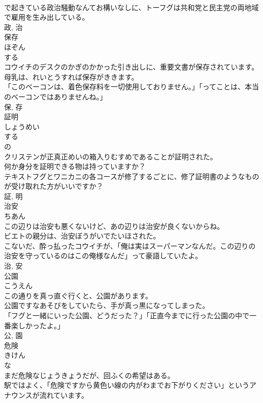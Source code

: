 \documentclass[8pt]{extreport}
\begin{document}
\begin{CJK}{UTF8}{min}
\\	で起きている政治騒動なんてお構いなしに、トーフグは共和党と民主党の両地域で雇用を生み出している。	
\\	政, 治	
\\	保存	
\\	ほぞん	
\\	する 
\\	コウイチのデスクのかぎのかかった引き出しに、重要文書が保存されています。	
\\	母乳は、れいとうすれば保存がききます。	
\\	「このベーコンは、着色保存料を一切使用しておりません。」「ってことは、本当のベーコンではありませんね。」	
\\	保, 存	
\\	証明	
\\	しょうめい	
\\	する 
\\	の 
\\	クリステンが正真正めいの箱入りむすめであることが証明された。	
\\	何か身分を証明できる物は持っていますか？	
\\	テキストフグとワニカニの各コースが修了するごとに、修了証明書のようなものが受け取れた方がいいですか？	
\\	証, 明	
\\	治安	
\\	ちあん	
\\	この辺りは治安も悪くないけど、あの辺りは治安が良くないからね。	
\\	ビエトの親分は、治安ぼうがいでたいほされた。	
\\	こないだ、酔っ払ったコウイチが、「俺は実はスーパーマンなんだ。この辺りの治安を守っているのはこの俺様なんだ」って豪語していたよ。	
\\	治, 安	
\\	公園	
\\	こうえん	
\\	この通りを真っ直ぐ行くと、公園があります。	
\\	公園ですなあそびをしていたら、手が真っ黒になってしまった。	
\\	「フグと一緒にいった公園、どうだった？」「正直今までに行った公園の中で一番楽しかったよ。」	
\\	公, 園	
\\	危険	
\\	きけん	
\\	な 
\\	まだ危険なじょうきょうだが、回ふくの希望はある。	
\\	駅ではよく、「危険ですから黄色い線の内がわまでお下がりください」というアナウンスが流れています。	

\end{CJK}
\end{document}
